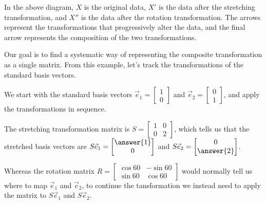 \documentclass{ximera}
\begin{document}
\begin{exploration}
\begin{example}
\begin{remark}

        In the above diagram, $X$ is the original data, $X'$ is the data after the stretching transformation, and $X''$ is the data after the rotation transformation. The arrows represent the transformations that progressively alter the data, and the final arrow represents the composition of the two transformations.

    \end{remark}

    Our goal is to find a systematic way of representing the composite transformation as a single matrix. From this example, let's track the transformations of the standard basis vectors.

    We start with the standard basis vectors $\vec{e}_1=\begin{bmatrix} 1 \\ 0 \end{bmatrix}$ and $\vec{e}_2=\begin{bmatrix} 0 \\ 1 \end{bmatrix}$, and apply the transformations in sequence.

    The stretching transformation matrix is $S=\begin{bmatrix} 1 & 0 \\ 0 & 2 \end{bmatrix}$, which tells us that the stretched basis vectors are $S\vec{e}_1=\begin{bmatrix}\answer{1} \\ 0 \end{bmatrix}$ and $S\vec{e}_2=\begin{bmatrix} 0 \\ \answer{2} \end{bmatrix}$.

    Whereas the rotation matrix $R=\begin{bmatrix} \cos 60 & -\sin 60 \\ \sin 60 & \cos 60 \end{bmatrix}$ would normally tell us where to map $\vec{e}_1$ and $\vec{e}_2$, to continue the tansformation we instead need to apply the matrix to $S\vec{e}_1$ and $S\vec{e}_2$.


\end{example}
\end{exploration}
\end{document}
